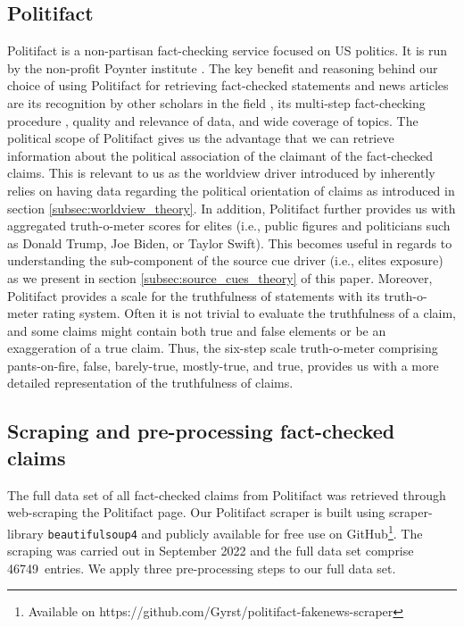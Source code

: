 \documentclass[
10pt, %
a4paper, %
oneside, %
headinclude,footinclude, %
] {book}%
\newcommand{\pltfctBORN}{46749}
\newcommand{\pltfctBORN}{46749}%
\begin{document}
\subsection{Politifact}
\label{subsec:politifact}
Politifact is a non-partisan fact-checking service focused on US politics. It is run by the non-profit Poynter institute \citep{politifact_whopays}. The key benefit and reasoning behind our choice of using Politifact for retrieving fact-checked statements and news articles are its recognition by other scholars in the field \citep{shu2018userprofiles, shu2020fakenewsnet, mosleh2021elites}, its multi-step fact-checking procedure \citep{politifact_methodology}, quality and relevance of data, and wide coverage of topics. The political scope of Politifact gives us the advantage that we can retrieve information about the political association of the claimant of the fact-checked claims. This is relevant to us as the worldview driver introduced by \cite{psychological_drivers_misinformation} inherently relies on having data regarding the political orientation of claims as introduced in section \ref{subsec:worldview_theory}. In addition, Politifact further provides us with aggregated truth-o-meter scores for elites (i.e., public figures and politicians such as Donald Trump, Joe Biden, or Taylor Swift). This becomes useful in regards to understanding the sub-component of the source cue driver (i.e., elites exposure) as we present in section \ref{subsec:source_cues_theory} of this paper. 
Moreover, Politifact provides a scale for the truthfulness of statements with its truth-o-meter rating system. Often it is not trivial to evaluate the truthfulness of a claim, and some claims might contain both true and false elements or be an exaggeration of a true claim. Thus, the six-step scale truth-o-meter comprising pants-on-fire, false, barely-true, mostly-true, and true, provides us with a more detailed representation of the truthfulness of claims.


\subsection{Scraping and pre-processing fact-checked claims}
\label{subsec:scraping_fake_news}

The full data set of all fact-checked claims from Politifact was retrieved through web-scraping the Politifact page. Our Politifact scraper is built using scraper-library \texttt{beautifulsoup4} and publicly available for free use on GitHub\footnote{Available on https://github.com/Gyrst/politifact-fakenews-scraper}. The scraping was carried out in September 2022 and the full data set comprise \pltfctBORN\ entries. We apply three pre-processing steps to our full data set. 
\end{document}
